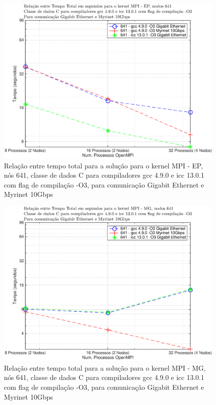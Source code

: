 \documentclass[conference,compsoc]{IEEEtran}
\begin{document}
\begin{figure}[H]
\centering
\includegraphics[width=1.1\columnwidth]{EPS/MPI/641/mpi_641_ep.eps}
\caption{Relação entre tempo total para a solução para o kernel MPI - EP, nós 641, classe de dados C para compiladores gcc 4.9.0 e icc 13.0.1 com flag de compilação  -O3, para comunicação Gigabit Ethernet e Myrinet 10Gbps}
\label{tempo_mpi_ep_641}
\end{figure}


\begin{figure}[H]
\centering
\includegraphics[width=1.1\columnwidth]{EPS/MPI/641/mpi_641_mg.eps}
\caption{Relação entre tempo total para a solução para o kernel MPI - MG, nós 641, classe de dados C para compiladores gcc 4.9.0 e icc 13.0.1 com flag de compilação  -O3, para comunicação Gigabit Ethernet e Myrinet 10Gbps}
\label{tempo_mpi_mg_641}
\end{figure}
\end{document}
